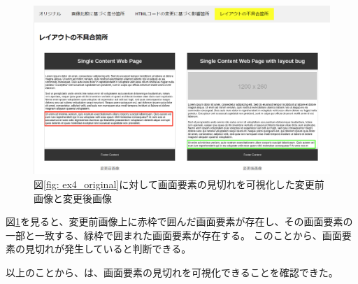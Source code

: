 \begin{figure}[tp]
    \begin{center}
        \includegraphics[width=1.0\columnwidth]{image/5/ex4_subeffect.png}
        \caption{図\ref{fig: ex4_original}に対して画面要素の見切れを可視化した変更前画像と変更後画像}
        \label{fig: ex4_subeffect}
    \end{center}
\end{figure}
図\ref{fig: ex4_subeffect}を見ると、変更前画像上に赤枠で囲んだ画面要素が存在し、その画面要素の一部と一致する、緑枠で囲まれた画面要素が存在する。
このことから、画面要素の見切れが発生していると判断できる。
\par
以上のことから、\toolName は、画面要素の見切れを可視化できることを確認できた。

